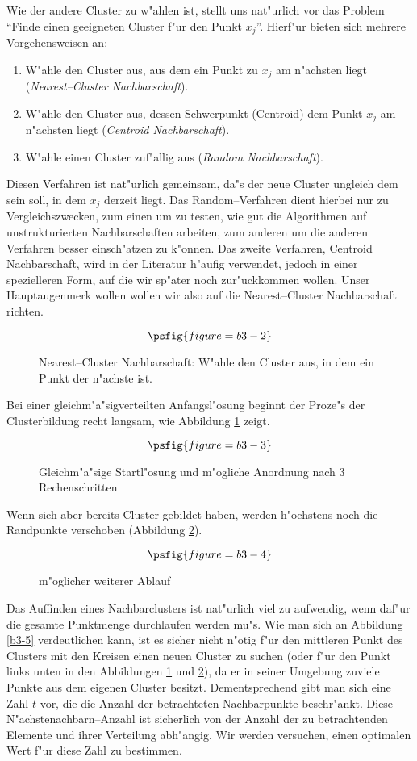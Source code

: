 Wie der andere Cluster zu w"ahlen ist, stellt uns nat"urlich
vor das Problem "`Finde einen geeigneten Cluster f"ur den Punkt $x_j$"'.
Hierf"ur bieten sich mehrere Vorgehensweisen an:
\begin{enumerate}
\item W"ahle den Cluster aus, aus dem ein Punkt zu $x_j$ am n"achsten liegt
	({\em Nearest--Cluster Nachbarschaft}).
\item W"ahle den Cluster aus, dessen Schwerpunkt (Centroid) dem Punkt
	$x_j$ am n"achsten liegt ({\em Centroid Nachbarschaft}).
\item W"ahle einen Cluster zuf"allig aus ({\em Random Nachbarschaft}).
\end{enumerate}
Diesen Verfahren ist nat"urlich gemeinsam, da"s der neue Cluster
ungleich dem sein soll, in dem $x_j$ derzeit liegt.
Das Random--Verfahren dient hierbei nur zu Vergleichszwecken, zum einen
um zu testen, wie gut die Algorithmen auf unstrukturierten Nachbarschaften
arbeiten, zum anderen um die anderen Verfahren besser einsch"atzen zu
k"onnen.
Das zweite Verfahren, Centroid Nachbarschaft, wird in der Literatur
h"aufig verwendet, jedoch in einer spezielleren Form, auf die wir sp"ater
noch zur"uckkommen wollen. Unser Hauptaugenmerk wollen wollen wir also
auf die Nearest--Cluster Nachbarschaft richten.

\begin{figure}[htp]
\[\psfig{figure=b3-2}\]
\caption{Nearest--Cluster Nachbarschaft: W"ahle den Cluster aus, in
	dem ein Punkt der n"achste ist.}
\end{figure}

Bei einer gleichm"a"sigverteilten Anfangsl"osung beginnt der Proze"s der
Clusterbildung recht langsam, wie Abbildung \ref{b3-3} zeigt.
\begin{figure}[htp]
\[\psfig{figure=b3-3}\]
\caption{Gleichm"a"sige Startl"osung und m"ogliche Anordnung nach 3
	Rechenschritten \label{b3-3}}
\end{figure}

Wenn sich aber bereits Cluster gebildet haben, werden h"ochstens noch
die Randpunkte verschoben (Abbildung \ref{b3-4}).

\begin{figure}[htbp]
\[\psfig{figure=b3-4}\]
\caption{m"oglicher weiterer Ablauf \label{b3-4}}
\end{figure}

Das Auf\/finden eines Nachbarclusters ist nat"urlich viel zu aufwendig,
wenn daf"ur die gesamte Punktmenge durchlaufen werden mu"s.
Wie man sich an Abbildung \ref{b3-5} 
verdeutlichen kann, ist es sicher nicht n"otig f"ur den mittleren Punkt des
Clusters mit den Kreisen einen neuen Cluster zu suchen
(oder f"ur den Punkt links unten in den 
Abbildungen \ref{b3-3} und \ref{b3-4}), 
da er in seiner Umgebung zuviele Punkte aus dem eigenen Cluster besitzt.
Dementsprechend gibt man sich eine Zahl $t$ vor, die die Anzahl der
betrachteten Nachbarpunkte beschr"ankt.
Diese N"achstenachbarn--Anzahl ist sicherlich von der Anzahl der zu 
betrachtenden Elemente und ihrer Verteilung abh"angig. Wir werden
versuchen, einen optimalen Wert f"ur diese Zahl zu bestimmen.

